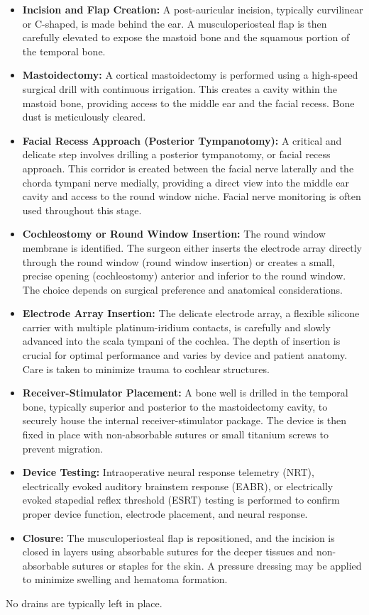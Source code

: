 \begin{itemize}
  \item \textbf{Incision and Flap Creation:} A post-auricular incision, typically curvilinear or C-shaped, is made behind the ear. A musculoperiosteal flap is then carefully elevated to expose the mastoid bone and the squamous portion of the temporal bone.
  \item \textbf{Mastoidectomy:} A cortical mastoidectomy is performed using a high-speed surgical drill with continuous irrigation. This creates a cavity within the mastoid bone, providing access to the middle ear and the facial recess. Bone dust is meticulously cleared.
  \item \textbf{Facial Recess Approach (Posterior Tympanotomy):} A critical and delicate step involves drilling a posterior tympanotomy, or facial recess approach. This corridor is created between the facial nerve laterally and the chorda tympani nerve medially, providing a direct view into the middle ear cavity and access to the round window niche. Facial nerve monitoring is often used throughout this stage.
  \item \textbf{Cochleostomy or Round Window Insertion:} The round window membrane is identified. The surgeon either inserts the electrode array directly through the round window (round window insertion) or creates a small, precise opening (cochleostomy) anterior and inferior to the round window. The choice depends on surgical preference and anatomical considerations.
  \item \textbf{Electrode Array Insertion:} The delicate electrode array, a flexible silicone carrier with multiple platinum-iridium contacts, is carefully and slowly advanced into the scala tympani of the cochlea. The depth of insertion is crucial for optimal performance and varies by device and patient anatomy. Care is taken to minimize trauma to cochlear structures.
  \item \textbf{Receiver-Stimulator Placement:} A bone well is drilled in the temporal bone, typically superior and posterior to the mastoidectomy cavity, to securely house the internal receiver-stimulator package. The device is then fixed in place with non-absorbable sutures or small titanium screws to prevent migration.
  \item \textbf{Device Testing:} Intraoperative neural response telemetry (NRT), electrically evoked auditory brainstem response (EABR), or electrically evoked stapedial reflex threshold (ESRT) testing is performed to confirm proper device function, electrode placement, and neural response.
  \item \textbf{Closure:} The musculoperiosteal flap is repositioned, and the incision is closed in layers using absorbable sutures for the deeper tissues and non-absorbable sutures or staples for the skin. A pressure dressing may be applied to minimize swelling and hematoma formation.
\end{itemize}
No drains are typically left in place.

